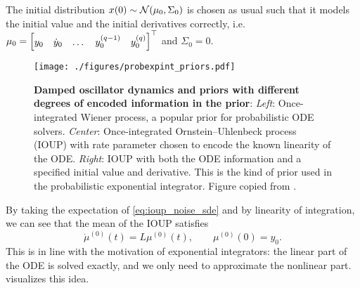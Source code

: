 \documentclass{mimosis}
\begin{document}
The initial distribution
\(\st(0) \sim \N( \mu_0, \Sigma_0 )\)
is chosen as usual such that it models the initial value and the initial derivatives correctly, i.e.
\(\mu_0 = \begin{bmatrix} y_0 & \dot{y}_0 & \dots & y_0^{(q-1)} & y_0^{(q)} \end{bmatrix}^\top\)
and
\(\Sigma_0 = 0\).
\begin{figure}[t]
\centering
\texttt{[image: ./figures/probexpint\_priors.pdf]}
\caption{\label{fig:probexpint:prior}\textbf{Damped oscillator dynamics and priors with different degrees of encoded information in the prior}: \emph{Left}: Once-integrated Wiener process, a popular prior for probabilistic ODE solvers. \emph{Center}: Once-integrated Ornstein--Uhlenbeck process (IOUP) with rate parameter chosen to encode the known linearity of the ODE. \emph{Right}: IOUP with both the ODE information and a specified initial value and derivative. This is the kind of prior used in the probabilistic exponential integrator. Figure copied from \protect\probexpint{}.}
\end{figure}
\begin{remark}
\label{remark:exact-solutions}
By taking the expectation of \cref{eq:ioup_noise_sde} and by linearity of integration, we can see that the mean of the IOUP satisfies
\begin{equation}
  \label{eq:ltisde:mean}
  \dot{\mu}^{(0)}(t) = L \mu^{(0)}(t), \qquad \mu^{(0)}(0) = y_0.
\end{equation}
This is in line with the motivation of exponential integrators: the linear part of the ODE is solved exactly, and we only need to approximate the nonlinear part.
 visualizes this idea.
\end{remark}
\end{document}
